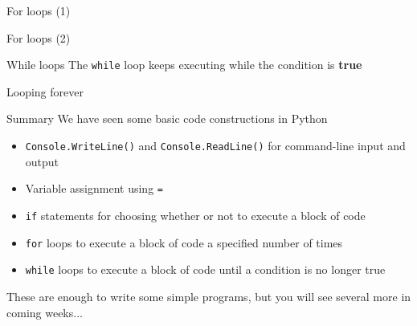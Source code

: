 \begin{frame}{For loops (1)}
\end{frame}

\begin{frame}{For loops (2)}
\end{frame}

\begin{frame}{While loops}
The \lstinline{while} loop keeps executing while the condition is \textbf{true}

\end{frame}

\begin{frame}{Looping forever}

\end{frame}

\begin{frame}{Summary}
 We have seen some basic code constructions in Python
\begin{itemize}
\item \lstinline{Console.WriteLine()} and \lstinline{Console.ReadLine()} for command-line input and output
\item Variable assignment using \lstinline{=}
\item \lstinline{if} statements for choosing whether or not to execute a block of code
\item \lstinline{for} loops to execute a block of code a specified number of times
\item \lstinline{while} loops to execute a block of code until a condition is no longer true
\end{itemize}
 These are enough to write some simple programs, but you will see several more in coming weeks...
\end{frame}

